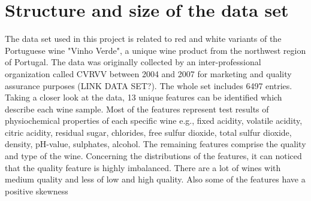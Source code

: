 \section{Structure and size of the data set}\label{sec:data_structure}


The data set used in this project is related to red and white variants of the Portuguese wine "Vinho Verde", a unique wine product from the northwest region of Portugal. The data was originally collected by an inter-professional organization called CVRVV between 2004 and 2007 for marketing and quality assurance purposes (LINK DATA SET?). The whole set includes 6497 entries.
Taking a closer look at the data, 13 unique features can be identified which describe each wine sample. Most of the features represent test results of physiochemical properties of each specific wine e.g., fixed acidity, volatile acidity, citric acidity, residual sugar, chlorides, free sulfur dioxide, total sulfur dioxide, density, pH-value, sulphates, alcohol. The remaining features comprise the quality and type of the wine. Concerning the distributions of the features, it can noticed that the quality feature is highly imbalanced. There are a lot of wines with medium quality and less of low and high quality. Also some of the features have a positive skewness